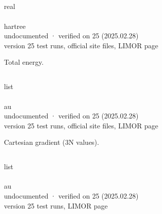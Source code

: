 \documentclass[letterpaper,10pt,english,openany,oneside]{sphinxmanual}
\begin{document}
\subsection{}
\label{\detokenize{reference/Energy:e}}\label{\detokenize{reference/Energy:energy-e}}
\ignorespaces 
\sphinxAtStartPar
{} real\\
 \\
 hartree\\
 undocumented · verified on 25 (2025.02.28)\\
 version 25 test runs, official site files, LIMOR page

\sphinxAtStartPar
Total energy.


\subsection{}
\label{\detokenize{reference/Energy:g}}\label{\detokenize{reference/Energy:energy-g}}
\ignorespaces 
\sphinxAtStartPar
{} list\\
 \\
 au\\
 undocumented · verified on 25 (2025.02.28)\\
 version 25 test runs, official site files, LIMOR page

\sphinxAtStartPar
Cartesian gradient (3N values).


\subsection{}
\label{\detokenize{reference/Energy:h}}\label{\detokenize{reference/Energy:energy-h}}
\ignorespaces 
\sphinxAtStartPar
{} list\\
 \\
 au\\
 undocumented · verified on 25 (2025.02.28)\\
 version 25 test runs, LIMOR page
\end{document}
